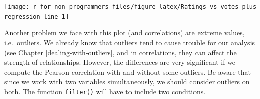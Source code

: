 \documentclass[
]{book}
\newenvironment{Shaded}{\begin{snugshade}}{\end{snugshade}}
\newcommand{\CommentTok}[1]{\textcolor[rgb]{0.56,0.35,0.01}{\textit{#1}}}
\newcommand{\DocumentationTok}[1]{\textcolor[rgb]{0.56,0.35,0.01}{\textbf{\textit{#1}}}}
\newcommand{\FloatTok}[1]{\textcolor[rgb]{0.00,0.00,0.81}{#1}}
\newcommand{\FunctionTok}[1]{\textcolor[rgb]{0.00,0.00,0.00}{#1}}
\newcommand{\NormalTok}[1]{#1}
\newcommand{\OtherTok}[1]{\textcolor[rgb]{0.56,0.35,0.01}{#1}}
\newcommand{\SpecialCharTok}[1]{\textcolor[rgb]{0.00,0.00,0.00}{#1}}
\begin{document}
\begin{center}\texttt{[image: r\_for\_non\_programmers\_files/figure-latex/Ratings vs votes plus regression line-1]} \end{center}

Another problem we face with this plot (and correlations) are extreme values, i.e.~outliers. We already know that outliers tend to cause trouble for our analysis (see Chapter \ref{dealing-with-outliers}, and in correlations, they can affect the strength of relationships. However, the differences are very significant if we compute the Pearson correlation with and without some outliers. Be aware that since we work with two variables simultaneously, we should consider outliers on both. The function \texttt{filter()} will have to include two conditions.

\begin{Shaded}
\end{Shaded}
\end{document}
